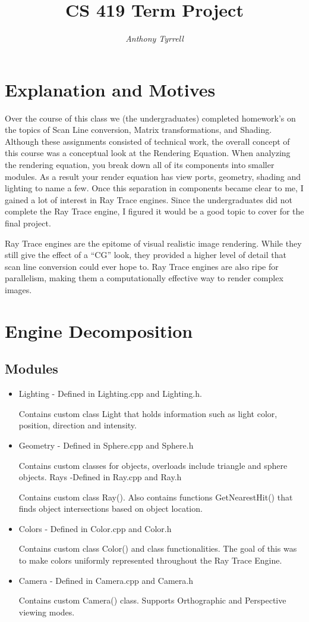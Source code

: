 \documentclass{article}
\title{CS 419 Term Project}
\author{\emph{Anthony Tyrrell}}
\begin{document}
\maketitle
\tableofcontents
\newpage
\section{Explanation and Motives}

Over the course of this class we (the undergraduates) completed homework's on the topics of Scan Line conversion, Matrix transformations, and Shading. Although these assignments consisted of technical work, the overall concept of this course was a conceptual look at the Rendering Equation. When analyzing the rendering equation, you break down all of its components into smaller modules. As a result your render equation has view ports, geometry, shading and lighting to name a few. Once this separation in components became clear to me, I gained a lot of interest in Ray Trace engines. Since the undergraduates did not complete the Ray Trace engine, I figured it would be a good topic to cover for the final project.

Ray Trace engines are the epitome of visual realistic image rendering. While they still give the effect of a “CG” look, they provided a higher level of detail that scan line conversion could ever hope to. Ray Trace engines are also ripe for parallelism, making them a computationally effective way to render complex images. 

\section{Engine Decomposition}
\subsection{
Modules
}
\begin{itemize}
  \item Lighting - Defined in Lighting.cpp and Lighting.h. 
  
Contains custom class Light that holds information such as light color, position, direction and intensity.
  
  \item Geometry - Defined in Sphere.cpp and Sphere.h

Contains custom classes for objects, overloads include triangle and sphere objects. 
Rays -Defined in Ray.cpp and Ray.h

Contains custom class Ray(). Also contains functions GetNearestHit() that finds object intersections based on object location.
  
  \item Colors - Defined in Color.cpp and Color.h
  
  Contains custom class Color() and class functionalities. The goal of this was to make colors uniformly represented throughout the Ray Trace Engine.
  
  \item Camera - Defined in Camera.cpp and Camera.h
  
  Contains custom Camera() class. Supports Orthographic and Perspective viewing modes.


\end{itemize}
\end{document}
